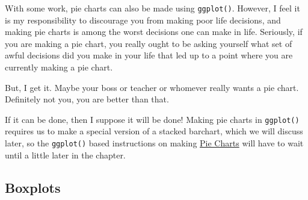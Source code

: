 \documentclass[
  letterpaper,
]{book}
\begin{document}
With some work, pie charts can also be made using \texttt{ggplot()}.
However, I feel it is my responsibility to discourage you from making
poor life decisions, and making pie charts is among the worst decisions
one can make in life. Seriously, if you are making a pie chart, you
really ought to be asking yourself what set of awful decisions did you
make in your life that led up to a point where you are currently making
a pie chart.

But, I get it. Maybe your boss or teacher or whomever really wants a pie
chart. Definitely not you, you are better than that.

\begin{figure}


\caption{\label{fig-padme-anakin}}

\end{figure}%

If it can be done, then I suppose it will be done! Making pie charts in
\texttt{ggplot()} requires us to make a special version of a stacked
barchart, which we will discuss later, so the \texttt{ggplot()} based
instructions on making \hyperref[pie-charts]{Pie Charts} will have to
wait until a little later in the chapter.

\subsection{Boxplots}\label{boxplots}
\end{document}
